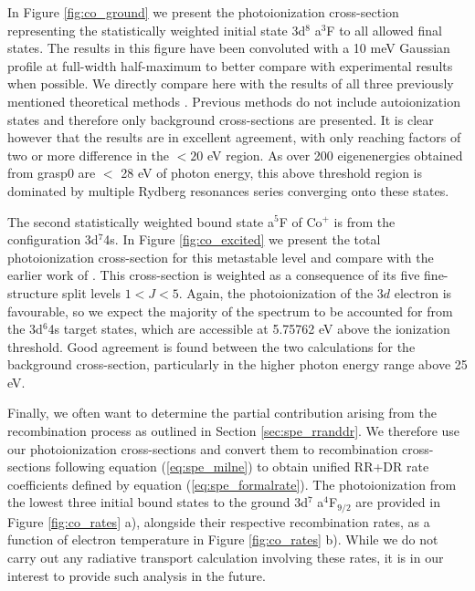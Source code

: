 In Figure \ref{fig:co_ground} we present the photoionization cross-section representing the statistically weighted initial state 3d$^8$ a$^3$F to all allowed final states. The results in this figure have been convoluted with a 10 meV Gaussian profile at full-width half-maximum to better compare with experimental results when possible. We directly compare here with the results of all three previously mentioned theoretical methods \citep{1979ApJS...40..815R, 1993ADNDT..55..233V, 2015JPhB...48n4014F}. Previous methods do not include autoionization states and therefore only background cross-sections are presented. It is clear however that the results are in excellent agreement, with only \citet{1979ApJS...40..815R} reaching factors of two or more difference in the $< 20$ eV region. As over 200 eigenenergies obtained from {\sc grasp}0 are $<$ 28 eV of photon energy, this above threshold region is dominated by multiple Rydberg resonances series converging onto these states. 

The second statistically weighted bound state a$^5$F of Co$^{+}$ is from the configuration 3d$^7$4s. In Figure \ref{fig:co_excited} we present the total photoionization cross-section for this metastable level and compare with the earlier work of \citet{1979ApJS...40..815R}. 
This cross-section is weighted as a consequence of its five fine-structure split levels $1 < J < 5$. Again, the photoionization of the $3d$ electron is favourable, so we expect the majority of the spectrum to be accounted for from the 3d$^6$4s target states, which are accessible at 5.75762 eV above the ionization threshold. Good agreement is found between the two calculations for the background cross-section, particularly in the higher photon energy range above 25 eV.

Finally, we often want to determine the partial contribution arising from the recombination process as outlined in Section \ref{sec:spe_rranddr}. We therefore use our photoionization cross-sections and convert them to recombination cross-sections following equation (\ref{eq:spe_milne}) to obtain unified RR+DR rate coefficients defined by equation (\ref{eq:spe_formalrate}). The photoionization from the lowest three initial bound states to the ground 3d$^7$  a$^4$F$_{9/2}$ are provided in Figure \ref{fig:co_rates} a), alongside their respective recombination rates, as a function of electron temperature in Figure \ref{fig:co_rates} b). While we do not carry out any radiative transport calculation involving these rates, it is in our interest to provide such analysis in the future.


